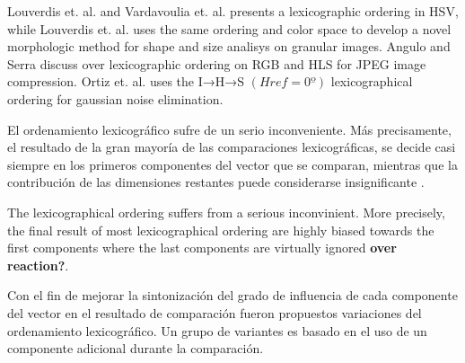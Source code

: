 Louverdis et. al. \cite{louverdis2002new} and Vardavoulia et. al. \cite{vardavoulia2002vector} presents a lexicographic ordering in HSV, while Louverdis et. al. \cite{louverdis2002morphological} uses the same ordering and color space to develop a novel morphologic method for shape and size analisys on granular images. Angulo and Serra \cite{angulo2003morphological} discuss over lexicographic ordering on RGB and HLS for JPEG image compression. Ortiz et. al. \cite{ortiz2004morphological} uses the I→H→S $(Href=0º)$ lexicographical ordering for gaussian noise elimination.


El ordenamiento lexicogr\'afico sufre de un serio inconveniente. M\'as precisamente, el resultado de la gran mayor\'ia de las comparaciones lexicogr\'aficas, se decide casi siempre en los primeros componentes del vector que se comparan, mientras que la contribuci\'on de las dimensiones restantes puede considerarse insignificante \cite{hanbury2002mathematical3}. 

The lexicographical ordering suffers from a serious inconvinient. More precisely, the final result of most lexicographical ordering are highly biased towards the first components where the last components are virtually ignored \cite{hanbury2002mathematical3} \textbf{over reaction?}.
 
Con el fin de mejorar la sintonizaci\'on del grado de influencia de cada componente del vector en el resultado de comparaci\'on fueron propuestos variaciones del ordenamiento lexicogr\'afico. Un grupo de variantes es basado en el uso de un componente adicional durante la comparaci\'on.



